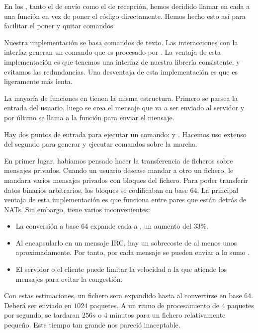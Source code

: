 \documentclass[12pt, a4paper]{memoriaeps}
\begin{document}
En los , tanto el de envío como el de recepción, hemos decidido llamar en cada  a una función en vez de poner el código directamente. Hemos hecho esto así para facilitar el poner y quitar comandos

Nuestra implementación se basa comandos de texto. Las interacciones con la interfaz generan un comando que es procesado por . La ventaja de esta implementación es que tenemos una interfaz de nuestra librería consistente, y evitamos las redundancias. Una desventaja de esta implementación es que es ligeramente más lenta.


La mayoría de funciones en  tienen la misma estructura. Primero se parsea la entrada del usuario, luego se crea el mensaje que va a ser enviado al servidor y por último se llama a la función  para enviar el mensaje.

Hay dos puntos de entrada para ejecutar un comando:  y . Hacemos uso extenso del segundo para generar y ejecutar comandos sobre la marcha.



En primer lugar, habíamos pensado hacer la transferencia de ficheros sobre mensajes privados. Cuando un usuario desease mandar a otro un fichero, le mandara varios mensajes privados con bloques del fichero. Para poder transferir datos binarios arbitrarios, los bloques se codificaban en base 64. La principal ventaja de esta implementación es que funciona entre pares que están detrás de NATs. Sin embargo, tiene varios inconvenientes:

\begin{itemize}
	\item La conversión a base 64 expande cada  a , un aumento del 33\%.
	\item Al encapsularlo en un mensaje IRC, hay un sobrecoste de al menos unos  aproximadamente. Por tanto, por cada mensaje se pueden enviar a lo sumo .
	\item El servidor o el cliente puede limitar la velocidad a la que atiende los mensajes para evitar la congestión.
\end{itemize}

Con estas estimaciones, un fichero  sera expandido hasta  al convertirse en base 64. Deberá ser enviado en $1024$ paquetes. A un ritmo de procesamiento de $4$ paquetes por segundo, se tardaran $256 s$ o $4$ minutos para un fichero relativamente pequeño. Este tiempo tan grande nos pareció inaceptable.
\end{document}
